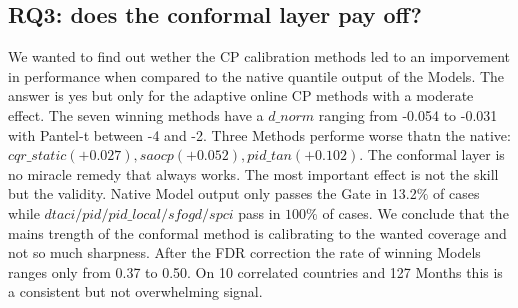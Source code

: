 \subsection{RQ3: does the conformal layer pay off?}
\label{sec:res:rq3}
We wanted to find out wether the CP calibration methods led to an imporvement in performance when compared to the native quantile output of the Models. The answer is yes but only for the adaptive online CP methods with a moderate effect. The seven winning methods have a $d\_norm$ ranging from -0.054 to -0.031 with Pantel-t between -4 and -2. Three Methods performe worse thatn the native: $cqr\_static (+0.027), saocp (+0.052),pid\_tan (+0.102)$. The conformal layer is no miracle remedy that always works. The most important effect is not the skill but the validity. Native Model output only passes the Gate in 13.2$\%$ of cases while $dtaci/pid/pid\_local/sfogd/spci$ pass in $100\%$ of cases. We conclude that the mains trength of the conformal method is calibrating to the wanted coverage and not so much sharpness. After the FDR correction the rate of winning Models ranges only from 0.37 to 0.50. On 10 correlated countries and 127 Months this is a consistent but not overwhelming signal.
